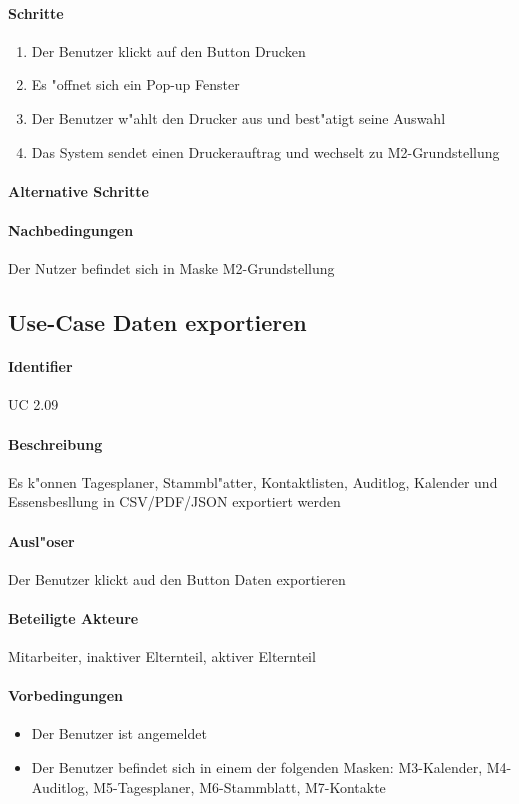   \paragraph{Schritte}
  \begin{enumerate}
   \item Der Benutzer klickt auf den Button \dq Drucken \dq
   \item Es "offnet sich ein Pop-up Fenster
   \item Der Benutzer w"ahlt den Drucker aus und best"atigt seine Auswahl
   \item Das System sendet einen Druckerauftrag und wechselt zu M2-Grundstellung
  \end{enumerate}
  \paragraph{Alternative Schritte}
  \paragraph{Nachbedingungen}
  Der Nutzer befindet sich in Maske M2-Grundstellung

  
  \newpage
 \subsection{Use-Case Daten exportieren}
  \paragraph{Identifier}
  UC 2.09
  \paragraph{Beschreibung}
    Es k"onnen Tagesplaner, Stammbl"atter, Kontaktlisten, Auditlog, Kalender und Essensbesllung in CSV/PDF/JSON exportiert werden
  \paragraph{Ausl"oser}
    Der Benutzer klickt aud den Button \dq Daten exportieren\dq

  \paragraph{Beteiligte Akteure}   \leavevmode \newline
    Mitarbeiter, inaktiver Elternteil, aktiver Elternteil
  \paragraph{Vorbedingungen}
    \begin{itemize}
   \item Der Benutzer ist angemeldet
   \item Der Benutzer befindet sich in einem der folgenden Masken: M3-Kalender, M4-Auditlog, M5-Tagesplaner, M6-Stammblatt, M7-Kontakte
  \end{itemize}
